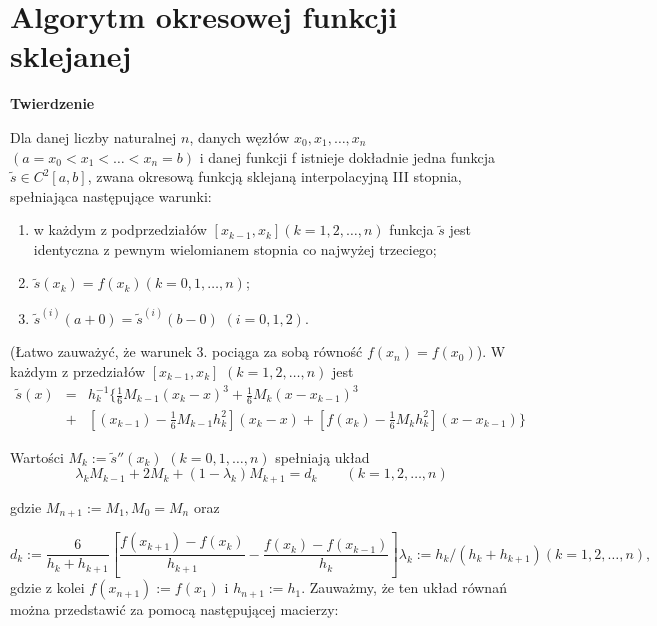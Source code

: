\documentclass{article}
\begin{document}
\section{Algorytm okresowej funkcji sklejanej}


\textbf{Twierdzenie}

Dla danej liczby naturalnej $n$, danych węzłów $x_0, x_1, \ldots , x_n$ $(a = x_0 < x_1 < \ldots < x_n = b)$
i danej funkcji f istnieje dokładnie jedna funkcja 
$\tilde{s} \in C^2 [a, b]$, zwana okresową funkcją
sklejaną interpolacyjną III stopnia, spełniająca następujące warunki:
\begin{enumerate}
\item w każdym z podprzedziałów $[x_{k-1} , x_k ] (k = 1, 2, \ldots, n)$ funkcja $\tilde{s}$ jest identyczna z pewnym wielomianem stopnia co najwyżej trzeciego;
\item $\tilde{s}(x_k ) = f(x_k ) (k = 0, 1, \ldots , n)$;
\item $\tilde{s}^{(i)} (a + 0) = \tilde{s}^{(i)} (b - 0)$ $(i = 0, 1, 2)$.
\end{enumerate}

(Łatwo zauważyć, że warunek 3. pociąga za sobą równość $f(x_n ) = f(x_0 )$). W każdym z przedziałów
$[x_{k-1} , x_k ]$ $(k = 1, 2, \ldots , n)$ jest
\begin{eqnarray*}
\tilde{s}(x) &=&  h_k^{-1} \Bigg\{ \frac{1}{6}M_{k-1} (x_k - x)^3 +\frac{1}{6} M_k (x - x_{k-1})^3 
\\ 
&+& \left[ (x_{k-1} ) - \frac{1}{6} M_{k-1} h_k^2 \right] (x_k - x) + \left[f(x_k) -\frac{1}{6} M_k h_k^2  \right] (x - x_{k-1} ) \Bigg\}
\end{eqnarray*}


Wartości $M_k := \tilde{s}'' (x_k)$ $(k = 0, 1, \ldots , n)$ spełniają układ
$$
\lambda_k M_{k-1} + 2M_k + (1 - \lambda_k )M_{k+1} = d_k\qquad (k = 1, 2, \ldots, n)
$$


gdzie $M_{n+1} := M_1 , M_0 = M_n$ oraz

$$
d_k :=\frac{6}{h_k + h_{k+1}}\left[ \frac{f(x_{k+1} ) - f(x_k)}{h_{k+1}} - \frac{ f(x_k ) - f(x_{k-1} )}{h_k}\right]
\lambda_k := h_k /(h_k + h_{k+1} )
(k = 1, 2, \ldots , n),
$$
gdzie z kolei $f(x_{n+1} ) := f(x_1 )$ i $h_{n+1} := h_1 $.
Zauważmy, że ten układ równań można przedstawić za pomocą następującej macierzy: \\
\end{document}
